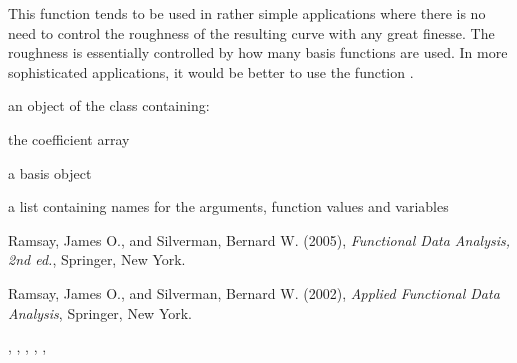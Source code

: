 \documentclass{article}
\begin{document}
\begin{Details}\relax
This function tends to be used in rather simple applications where
there is no need to control the roughness of the resulting curve with
any great finesse.  The roughness is essentially controlled by how
many basis functions are used.  In more sophisticated applications, it
would be better to use the function .
\end{Details}
\begin{Value}
an object of the  class containing:

\begin{ldescription}
\item[\code{coefs}] the coefficient array

\item[\code{basis}] a basis object 

\item[\code{fdnames}] a list containing names for the arguments, function values
and variables

\end{ldescription}
\end{Value}
\begin{References}\relax
Ramsay, James O., and Silverman, Bernard W. (2005), \emph{Functional 
Data Analysis, 2nd ed.}, Springer, New York. 

Ramsay, James O., and Silverman, Bernard W. (2002), \emph{Applied
Functional Data Analysis}, Springer, New York.
\end{References}
\begin{SeeAlso}\relax
{}, 
, 
, 
, 
, 
\end{SeeAlso}
\end{document}
